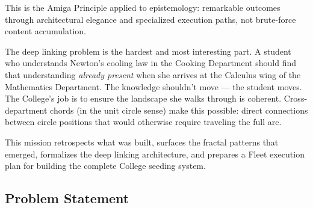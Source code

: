 \documentclass[11pt,letterpaper]{article}
\begin{document}
This is the Amiga Principle applied to epistemology: remarkable outcomes through architectural
elegance and specialized execution paths, not brute-force content accumulation.

The deep linking problem is the hardest and most interesting part. A student who understands
Newton's cooling law in the Cooking Department should find that understanding \textit{already present}
when she arrives at the Calculus wing of the Mathematics Department. The knowledge shouldn't move ---
the student moves. The College's job is to ensure the landscape she walks through is coherent.
Cross-department chords (in the unit circle sense) make this possible: direct connections between
circle positions that would otherwise require traveling the full arc.

This mission retrospects what was built, surfaces the fractal patterns that emerged, formalizes
the deep linking architecture, and prepares a Fleet execution plan for building the complete
College seeding system.

\subsection{Problem Statement}
\end{document}
